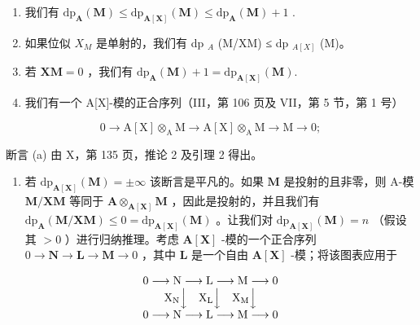 \begin{enumerate}
\def\labelenumi{\alph{enumi})}
\item
  我们有 \(\mathrm{dp}_{\mathbf{A}}(\mathbf{M}) \leqslant \mathrm{dp}_{\mathbf{A}[\mathbf{X}]}(\mathbf{M}) \leqslant \mathrm{dp}_{\mathbf{A}}(\mathbf{M}) + 1\) .
\item
  如果位似 \(X_{M}\) 是单射的，我们有 dp \(_{A}\) (M/XM) ≤ dp \(_{A[X]}\) (M)。
\item
  若 \(\mathbf{XM} = 0\) ，我们有 \(\mathrm{dp}_{\mathbf{A}}(\mathbf{M}) + 1 = \mathrm{dp}_{\mathbf{A}[\mathbf{X}]}(\mathbf{M}).\)
\item
  我们有一个 A{[}X{]}-模的正合序列（III，第 106 页及 VII，第 5 节，第 1 号）
\end{enumerate}

\[
0 \rightarrow \mathrm{A} [ \mathrm{X} ] \otimes_ {\mathrm{A}} \mathrm{M} \rightarrow \mathrm{A} [ \mathrm{X} ] \otimes_ {\mathrm{A}} \mathrm{M} \rightarrow \mathrm{M} \rightarrow 0;
\]

断言 (a) 由 X，第 135 页，推论 2 及引理 2 得出。

\begin{enumerate}
\def\labelenumi{\alph{enumi})}
\setcounter{enumi}{1}
\tightlist
\item
  若 \(\mathrm{dp}_{\mathbf{A}[\mathbf{X}]}(\mathbf{M}) = \pm \infty\) 该断言是平凡的。如果 \(\mathbf{M}\) 是投射的且非零，则 A-模 \(\mathbf{M} / \mathbf{XM}\) 等同于 \(\mathbf{A} \otimes_{\mathbf{A}[\mathbf{X}]} \mathbf{M}\) ，因此是投射的，并且我们有 \(\mathrm{dp}_{\mathbf{A}}(\mathbf{M} / \mathbf{XM}) \leqslant 0 = \mathrm{dp}_{\mathbf{A}[\mathbf{X}]}(\mathbf{M})\) 。让我们对 \(\mathrm{dp}_{\mathbf{A}[\mathbf{X}]}(\mathbf{M}) = n\) （假设其 \(>0\) ）进行归纳推理。考虑 \(\mathbf{A}[\mathbf{X}]\) -模的一个正合序列 \(0 \to \mathbf{N} \to \mathbf{L} \to \mathbf{M} \to 0\) ，其中 \(\mathbf{L}\) 是一个自由 \(\mathbf{A}[\mathbf{X}]\) -模；将该图表应用于
\end{enumerate}

\[
\begin{array}{c} 0 \longrightarrow \mathrm{N} \longrightarrow \mathrm{L} \longrightarrow \mathrm{M} \longrightarrow 0 \\ \mathrm {X_ {N}} \Big \downarrow \quad \mathrm {X_ {L}} \Big \downarrow \quad \mathrm {X_ {M}} \Big \downarrow \\ 0 \longrightarrow \mathrm{N} \longrightarrow \mathrm{L} \longrightarrow \mathrm{M} \longrightarrow 0 \end{array}
\]

